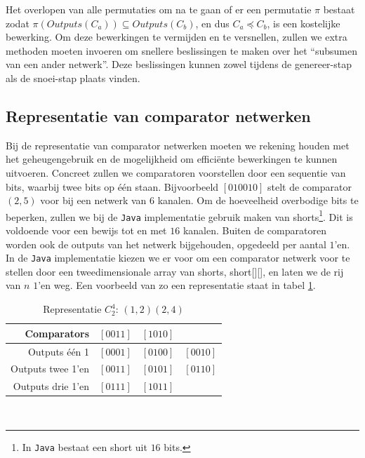 \documentclass{article}
\begin{document}
Het overlopen van alle permutaties om na te gaan of er een permutatie $\pi$ bestaat zodat ${\pi\left(Outputs\left(C_{a}\right)\right) \subseteq Outputs\left(C_{b}\right)}$, en dus $C_a \preceq C_{b}$, is een kostelijke bewerking.
Om deze bewerkingen te vermijden en te versnellen, zullen we extra methoden moeten invoeren om snellere beslissingen te maken over het ``subsumen van een ander netwerk''. 
Deze beslissingen kunnen zowel tijdens de genereer-stap als de snoei-stap plaats vinden.

\subsection{Representatie van comparator netwerken}
Bij de representatie van comparator netwerken moeten we rekening houden met het geheugengebruik en de mogelijkheid om effici\"ente bewerkingen te kunnen uitvoeren.
Concreet zullen we comparatoren voorstellen door een sequentie van bits, waarbij twee bits op \'e\'en staan. Bijvoorbeeld  $ \left[ 0 1 0 0 1 0 \right]$ stelt de comparator $\left(2,5\right)$ voor bij een netwerk van $6$ kanalen.
Om de hoeveelheid overbodige bits te beperken, zullen we bij de \texttt{Java} implementatie gebruik maken van shorts\footnote{In \texttt{Java} bestaat een short uit $16$ bits.}.
Dit is voldoende voor een bewijs tot en met $16$ kanalen.
Buiten de comparatoren worden ook de outputs van het netwerk bijgehouden, opgedeeld per aantal $1$'en. %
In de \texttt{Java} implementatie kiezen we er voor om een comparator netwerk voor te stellen door een tweedimensionale array van shorts, short[][], en laten we de rij van $n$ $1$'en weg.
Een voorbeeld van zo een representatie staat in tabel \ref{tabel2}.
\begin{table}[!h]
	\centering
	\begin{tabular}{r|ccc}
	Comparators & $\left[0011\right]$ & $\left[1010\right]$ & \\ 
	\hline 
	Outputs \'e\'en 1& $\left[0001\right]$ & $\left[0100\right]$ & $\left[0010\right]$ \\ 
	\hline 
	Outputs twee 1'en &$\left[0011\right]$ & $\left[0101\right]$ & $\left[0110\right]$\\ 
	\hline 
	Outputs drie 1'en & $\left[0111\right]$ & $\left[1011\right]$ &  \\ 
	\end{tabular}
	\caption{Representatie $C^4_2$: $(1,2)(2,4)$}
	\label{tabel2}
\end{table}
\\
\end{document}
